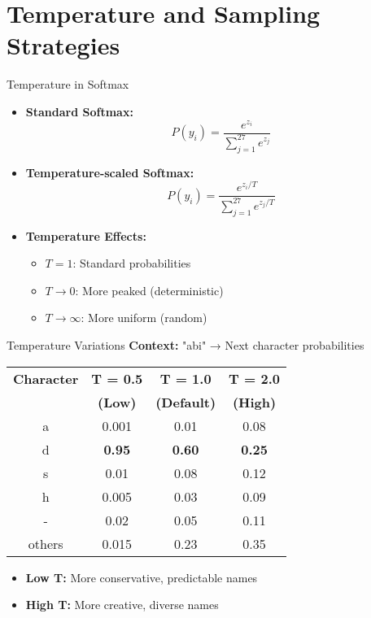 \documentclass[usenames,dvipsnames]{beamer}
\begin{document}
\section{Temperature and Sampling Strategies}

\begin{frame}{Temperature in Softmax}
\begin{itemize}[<+->]
\item \textbf{Standard Softmax:}
\begin{equation}
P(y_i) = \frac{e^{z_i}}{\sum_{j=1}^{27} e^{z_j}}
\end{equation}

\item \textbf{Temperature-scaled Softmax:}
\begin{equation}
P(y_i) = \frac{e^{z_i/T}}{\sum_{j=1}^{27} e^{z_j/T}}
\end{equation}

\item \textbf{Temperature Effects:}
\begin{itemize}
\item $T = 1$: Standard probabilities
\item $T \to 0$: More peaked (deterministic)
\item $T \to \infty$: More uniform (random)
\end{itemize}
\end{itemize}
\end{frame}

\begin{frame}{Temperature Variations}
\textbf{Context:} "abi" → Next character probabilities

\vspace{0.5cm}
\begin{center}
\begin{tabular}{|c|c|c|c|}
\hline
\textbf{Character} & \textbf{T = 0.5} & \textbf{T = 1.0} & \textbf{T = 2.0} \\
 & \textbf{(Low)} & \textbf{(Default)} & \textbf{(High)} \\
\hline
a & 0.001 & 0.01 & 0.08 \\
d & \textbf{0.95} & \textbf{0.60} & \textbf{0.25} \\
s & 0.01 & 0.08 & 0.12 \\
h & 0.005 & 0.03 & 0.09 \\
- & 0.02 & 0.05 & 0.11 \\
others & 0.015 & 0.23 & 0.35 \\
\hline
\end{tabular}
\end{center}

\vspace{0.5cm}
\begin{itemize}
\item \textbf{Low T:} More conservative, predictable names
\item \textbf{High T:} More creative, diverse names
\end{itemize}
\end{frame}
\end{document}

